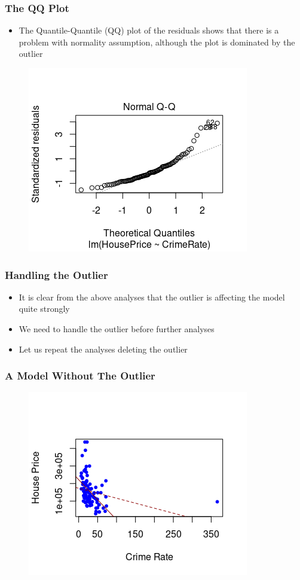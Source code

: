 \documentclass[10pt]{beamer}
\theoremstyle{plain}
\begin{document}
\begin{frame}
\frametitle{\sc The QQ Plot}
	\begin{itemize}
		\item The Quantile-Quantile (QQ) plot of the residuals shows that there is a problem with normality assumption, although the plot is dominated by the outlier
    \end{itemize}	
    \begin{figure}[!ht]
		\centering
		\includegraphics[scale=0.8]{figs8/QQ-full.png}
	\end{figure}	
\end{frame}

\begin{frame}
\frametitle{\sc Handling the Outlier}
	\begin{itemize}
		\item It is clear from the above analyses that the outlier is affecting the model quite  strongly
		\item We need to handle the outlier before further analyses
		\item Let us repeat the analyses deleting the outlier
    \end{itemize}	
\end{frame}

\begin{frame}
\frametitle{\sc A Model Without The Outlier}
    \begin{figure}[!ht]
		\centering
		\includegraphics[scale=0.9]{figs8/reg-minus-outlier.png}
	\end{figure}
\end{frame}
\end{document}
